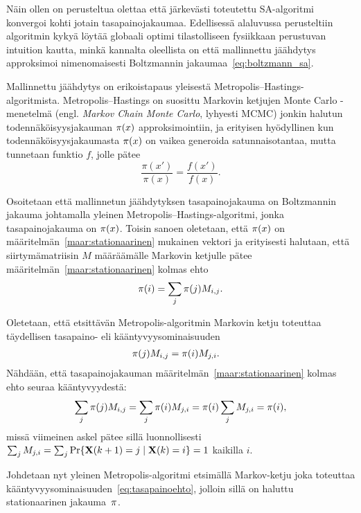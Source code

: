 Näin ollen on perusteltua olettaa että järkevästi toteutettu SA-algoritmi konvergoi kohti jotain tasapainojakaumaa.
Edellisessä alaluvussa perusteltiin algoritmin kykyä löytää globaali optimi
tilastolliseen fysiikkaan perustuvan intuition kautta,
minkä kannalta oleellista on että mallinnettu jäähdytys approksimoi nimenomaisesti Boltzmannin jakaumaa~\ref{eq:boltzmann_sa}.

Mallinnettu jäähdytys on erikoistapaus yleisestä Metropolis--Hastings-algo\-rit\-mista.
Metropolis--Hastings on suosittu Markovin ketjujen Monte Carlo -menetelmä (engl. \emph{Markov Chain Monte Carlo}, lyhyesti MCMC)  jonkin halutun todennäköisyysjakauman $\mathbf{\pi}(x)$ approksimointiin,
ja erityisen hyödyllinen kun todennäköisyysjakaumasta $\mathbf{\pi}(x)$ on vaikea generoida satunnaisotantaa, mutta tunnetaan funktio $f$, jolle pätee
\begin{equation}
    \frac{\pi(x')}{\pi(x)} = \frac{f(x')}{f(x)}.
\end{equation}

Osoitetaan että mallinnetun jäähdytyksen tasapainojakauma on Boltzmannin jakauma johtamalla yleinen Metropolis--Hastings-algoritmi,
jonka tasapainojakauma on $\mathbf{\pi}(x)$.
Toisin sanoen oletetaan, että $\mathbf{\pi}(x)$ on määritelmän~\ref{maar:stationaarinen} mukainen vektori ja erityisesti halutaan, että siirtymämatriisin $M$ määräämälle Markovin ketjulle pätee määritelmän~\ref{maar:stationaarinen} kolmas ehto
\begin{equation}
    \mathbf{\pi}(i) = \sum_j \mathbf{\pi}(j) M_{i,j}.
\end{equation}

Oletetaan, että etsittävän Metropolis-algoritmin Markovin ketju toteuttaa täydellisen tasapaino- eli kääntyvyysominaisuuden
\begin{align}
    \label{eq:tasapainoehto}
    \mathbf{\pi}(j) M_{i,j} &= \mathbf{\pi}(i) M_{j,i}.
\end{align}
Nähdään, että tasapainojakauman määritelmän~\ref{maar:stationaarinen} kolmas ehto seuraa kääntyvyydestä:
\begin{equation}
    \sum_j \mathbf{\pi}(j) M_{i,j} = \sum_j \mathbf{\pi}(i) M_{j,i}
                                 = \mathbf{\pi}(i) \sum_j M_{j,i}
                                 = \mathbf{\pi}(i), \label{eq:station_johto}
\end{equation}
missä viimeinen askel pätee sillä luonnollisesti $\sum_j M_{j,i} = \sum_j \Pr\{ \mathbf{X}(k+1) = j \mid \mathbf{X}(k) = i \} = 1$ kaikilla $i$.

Johdetaan nyt yleinen Metropolis-algoritmi etsimällä Markov-ketju joka toteuttaa kääntyvyysominaisuuden~\ref{eq:tasapainoehto},
jolloin sillä on haluttu stationaarinen jakauma~$\mathbf{\pi}$.

